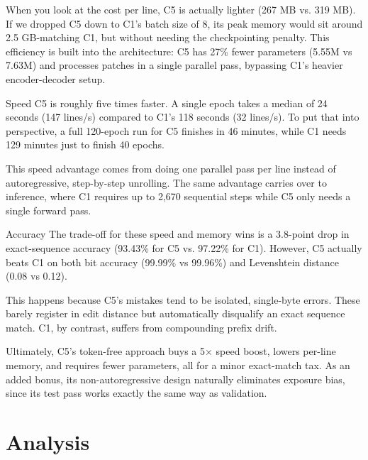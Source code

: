 \documentclass[12pt]{article}
\begin{document}
When you look at the cost per line, C5 is actually lighter (267 MB vs. 319 MB). If we dropped C5 down to C1's batch size of 8, its peak memory would sit around 2.5 GB-matching C1, but without needing the checkpointing penalty. This efficiency is built into the architecture: C5 has 27\% fewer parameters (5.55M vs 7.63M) and processes patches in a single parallel pass, bypassing C1's heavier encoder-decoder setup.

Speed
C5 is roughly five times faster. A single epoch takes a median of 24 seconds (147 lines/s) compared to C1's 118 seconds (32 lines/s). To put that into perspective, a full 120-epoch run for C5 finishes in 46 minutes, while C1 needs 129 minutes just to finish 40 epochs.

This speed advantage comes from doing one parallel pass per line instead of autoregressive, step-by-step unrolling. The same advantage carries over to inference, where C1 requires up to 2,670 sequential steps while C5 only needs a single forward pass.

Accuracy
The trade-off for these speed and memory wins is a 3.8-point drop in exact-sequence accuracy (93.43\% for C5 vs. 97.22\% for C1). However, C5 actually beats C1 on both bit accuracy (99.99\% vs 99.96\%) and Levenshtein distance (0.08 vs 0.12).

This happens because C5's mistakes tend to be isolated, single-byte errors. These barely register in edit distance but automatically disqualify an exact sequence match. C1, by contrast, suffers from compounding prefix drift.

Ultimately, C5's token-free approach buys a 5$\times$ speed boost, lowers per-line memory, and requires fewer parameters, all for a minor exact-match tax. As an added bonus, its non-autoregressive design naturally eliminates exposure bias, since its test pass works exactly the same way as validation.

\section{Analysis}
\label{sec:discussion}
\end{document}
